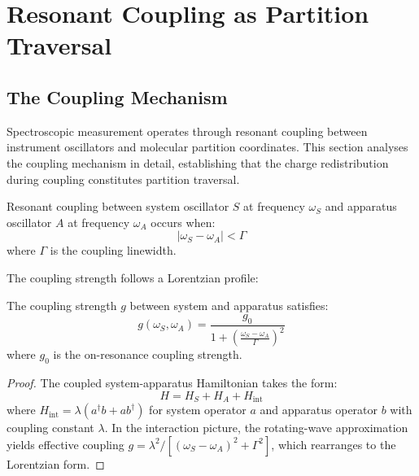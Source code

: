 \section{Resonant Coupling as Partition Traversal}
\label{sec:coupling}

\subsection{The Coupling Mechanism}

Spectroscopic measurement operates through resonant coupling between instrument oscillators and molecular partition coordinates. This section analyses the coupling mechanism in detail, establishing that the charge redistribution during coupling constitutes partition traversal.

\begin{definition}
\label{def:resonant_coupling}
Resonant coupling between system oscillator $S$ at frequency $\omega_S$ and apparatus oscillator $A$ at frequency $\omega_A$ occurs when:
\begin{equation}
|\omega_S - \omega_A| < \Gamma
\end{equation}
where $\Gamma$ is the coupling linewidth.
\end{definition}

The coupling strength follows a Lorentzian profile:

\begin{theorem}
\label{thm:lorentzian}
The coupling strength $g$ between system and apparatus satisfies:
\begin{equation}
g(\omega_S, \omega_A) = \frac{g_0}{1 + \left(\frac{\omega_S - \omega_A}{\Gamma}\right)^2}
\end{equation}
where $g_0$ is the on-resonance coupling strength.
\end{theorem}

\begin{proof}
The coupled system-apparatus Hamiltonian takes the form:
\begin{equation}
H = H_S + H_A + H_{\mathrm{int}}
\end{equation}
where $H_{\mathrm{int}} = \lambda (a^\dagger b + a b^\dagger)$ for system operator $a$ and apparatus operator $b$ with coupling constant $\lambda$. In the interaction picture, the rotating-wave approximation yields effective coupling $g = \lambda^2/[(\omega_S - \omega_A)^2 + \Gamma^2]$, which rearranges to the Lorentzian form.
\end{proof}

